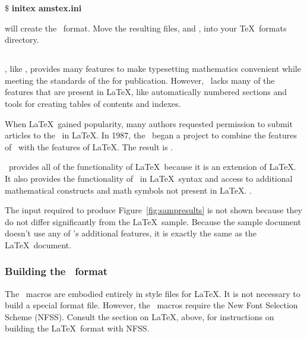 \begin{ttindent}
\$ \textbf{initex amstex.ini}
\end{ttindent}

will create the \AMSTeX\ format.  Move the resulting files,
  and 
, into 
your \TeX\ formats
directory.

\subsection{\protect\AMSLaTeX}

, like \AMSTeX, 
provides many features to make typesetting 
mathematics convenient while meeting the standards of the 
 for 
publication.  However, \AMSTeX\ lacks many of 
the features that are present in \LaTeX, like automatically numbered 
sections and tools for creating tables of contents and indexes.

When \LaTeX\ gained popularity, many authors requested permission to
submit articles to the \ams\ in \LaTeX.
In 1987, the \ams\ began a project to combine the features of \AMSTeX\
with the features of \LaTeX.  The result is \AMSLaTeX.

\AMSLaTeX\ provides all of the functionality of \LaTeX\ because it is an
extension of \LaTeX. It also provides the functionality of \AMSTeX\ in
\LaTeX\ syntax and access to additional mathematical constructs and math 
symbols not present in \LaTeX.  .

The input required to produce Figure~\ref{fig:sampresults} is not shown
because they do not differ significantly from the \LaTeX\ sample.
Because the sample document doesn't use any of \AMSLaTeX's additional
features, it is exactly the same as the \LaTeX\ document.

\subsubsection{Building the \protect\AMSLaTeX\ format}

The \AMSLaTeX\ macros are embodied entirely in style files for \LaTeX.  It is
not necessary to build a special format file.
However, the \AMSLaTeX\ macros require the New Font Selection
Scheme (NFSS).  Consult the section on \LaTeX, above, for instructions on
building the \LaTeX\ format with NFSS.

